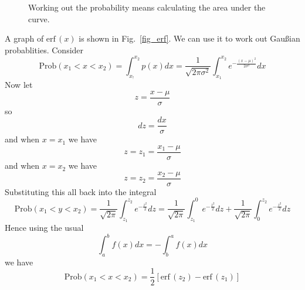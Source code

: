 \documentclass[11pt,a4paper]{scrartcl}
\begin{document}
\begin{figure}[tb]
\begin{center}

\end{center}
\caption{Working out the probability means calculating the area under the curve.\label{fig_prob}}
\end{figure}



A graph of $\mbox{erf}\,(x)$ is shown in Fig.~\ref{fig_erf}. We can use it to work out Gau\ss{}ian probablities. Consider
\begin{equation}
\mbox{Prob}(x_1<x<x_2)=\int_{x_!}^{x_2} p(x)dx=\frac{1}{\sqrt{2\pi\sigma^2}}\int_{x_1}^{x_2} e^{-\frac{(x-\mu)^2}{2\sigma^2}}dx 
\end{equation}
Now let
\begin{equation}
z=\frac{x-\mu}{\sigma}
\end{equation}
so 
\begin{equation}
dz=\frac{dx}{\sigma}
\end{equation}
and when $x=x_1$ we have
\begin{equation}
z=z_1=\frac{x_1-\mu}{\sigma}
\end{equation}
and when $x=x_2$ we have
\begin{equation}
z=z_2=\frac{x_2-\mu}{\sigma}
\end{equation}
Substituting this all back into the integral
\begin{equation}
\mbox{Prob}(x_1<y<x_2)=\frac{1}{\sqrt{2\pi}}\int_{z_1}^{z_2} e^{-\frac{z^2}{2}}dz=\frac{1}{\sqrt{2\pi}}\int_{z_1}^{0} e^{-\frac{z^2}{2}}dz+\frac{1}{\sqrt{2\pi}}\int_{0}^{z_2} e^{-\frac{z^2}{2}}dz
\end{equation}
Hence using the usual 
\begin{equation}
\int_a^bf(x)dx=-\int_b^a f(x)dx
\end{equation}
we have
\begin{equation}
\mbox{Prob}(x_1<x<x_2)=\frac{1}{2}[\mbox{erf}\,(z_2)-\mbox{erf}\,(z_1)]
\end{equation}
\end{document}
